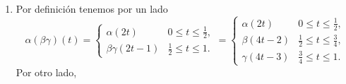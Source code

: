 \documentclass[bibtex, anon]{TEMat-article}
\begin{document}
\begin{demostracion}\
	\begin{enumerate}
		\item Por definición tenemos por un lado $$\alpha(\beta\gamma)(t)=\left\{\begin{array}{lc}
		\alpha(2t) & 0\leq t\leq\frac{1}{2},\\
		\beta\gamma(2t-1) & \frac{1}{2}\leq t\leq 1.
		\end{array}\right.=\left\{\begin{array}{lc}
		\alpha(2t) & 0\leq t\leq\frac{1}{2},\\
		\beta(4t-2) & \frac{1}{2}\leq t\leq\frac{3}{4},\\
		\gamma(4t-3) & \frac{3}{4}\leq t\leq 1.
		\end{array}\right.$$
		Por otro lado,
		

\end{enumerate}
\end{demostracion}
\end{document}
